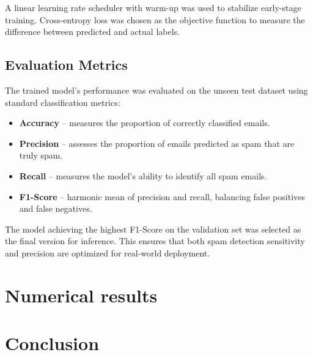 \documentclass[12pt]{article}
\begin{document}
A linear learning rate scheduler with warm-up was used to stabilize early-stage training.  
Cross-entropy loss was chosen as the objective function to measure the difference between predicted and actual labels.

\subsection{Evaluation Metrics}

The trained model’s performance was evaluated on the unseen test dataset using standard classification metrics:
\begin{itemize}
    \item \textbf{Accuracy} – measures the proportion of correctly classified emails.
    \item \textbf{Precision} – assesses the proportion of emails predicted as spam that are truly spam.
    \item \textbf{Recall} – measures the model’s ability to identify all spam emails.
    \item \textbf{F1-Score} – harmonic mean of precision and recall, balancing false positives and false negatives.
\end{itemize}

The model achieving the highest F1-Score on the validation set was selected as the final version for inference. This ensures that both spam detection sensitivity and precision are optimized for real-world deployment.


\section{Numerical results}


\section{Conclusion}
\end{document}
